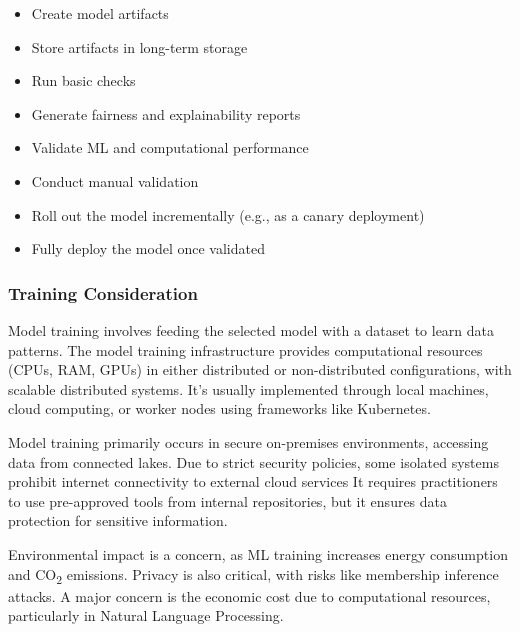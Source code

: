 \begin{itemize}
    \item Create model artifacts
    \item Store artifacts in long-term storage
    \item Run basic checks
    \item Generate fairness and explainability reports
\end{itemize}
\begin{itemize}
    \item Validate ML and computational performance
    \item Conduct manual validation
\end{itemize}
\begin{itemize}
    \item Roll out the model incrementally (e.g., as a canary deployment)
    \item Fully deploy the model once validated
\end{itemize}

\subsubsection{Training Consideration}

Model training involves feeding the selected model with a dataset to learn data patterns.
The model training infrastructure provides computational resources (CPUs, RAM, GPUs) in either distributed or non-distributed configurations, with scalable distributed systems.
It's usually implemented through local machines, cloud computing, or worker nodes using frameworks like Kubernetes\cite{Kreuzberger2022MachineLO, Haakman2021}.

Model training primarily occurs in secure on-premises environments, accessing data from connected lakes\cite{Haakman2021}.
Due to strict security policies, some isolated systems prohibit internet connectivity to external cloud services
It requires practitioners to use pre-approved tools from internal repositories, but it ensures data protection for sensitive information\cite{Haakman2021}.

Environmental impact is a concern, as ML training increases energy consumption and CO\textsubscript{2} emissions\cite{10.1145/3533378}.
Privacy is also critical, with risks like membership inference attacks\cite{10.1145/3533378, 10.1145/3555803}.
A major concern is the economic cost due to computational resources, particularly in Natural Language Processing\cite{10.1145/3533378}.


